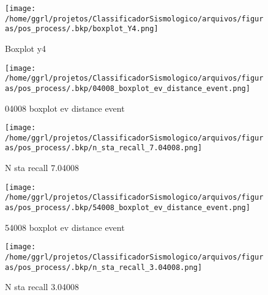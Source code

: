                     \begin{figure}[H]
                        \centering
                        \texttt{[image: /home/ggrl/projetos/ClassificadorSismologico/arquivos/figuras/pos\_process/.bkp/boxplot\_Y4.png]}
                        \caption{Boxplot y4}
                        \label{fig:boxplot_Y4}
                    \end{figure}
                

                    \begin{figure}[H]
                        \centering
                        \texttt{[image: /home/ggrl/projetos/ClassificadorSismologico/arquivos/figuras/pos\_process/.bkp/04008\_boxplot\_ev\_distance\_event.png]}
                        \caption{04008 boxplot ev distance event}
                        \label{fig:04008_boxplot_ev_distance_event}
                    \end{figure}
                

                    \begin{figure}[H]
                        \centering
                        \texttt{[image: /home/ggrl/projetos/ClassificadorSismologico/arquivos/figuras/pos\_process/.bkp/n\_sta\_recall\_7.04008.png]}
                        \caption{N sta recall 7.04008}
                        \label{fig:n_sta_recall_7.04008}
                    \end{figure}
                

                    \begin{figure}[H]
                        \centering
                        \texttt{[image: /home/ggrl/projetos/ClassificadorSismologico/arquivos/figuras/pos\_process/.bkp/54008\_boxplot\_ev\_distance\_event.png]}
                        \caption{54008 boxplot ev distance event}
                        \label{fig:54008_boxplot_ev_distance_event}
                    \end{figure}
                

                    \begin{figure}[H]
                        \centering
                        \texttt{[image: /home/ggrl/projetos/ClassificadorSismologico/arquivos/figuras/pos\_process/.bkp/n\_sta\_recall\_3.04008.png]}
                        \caption{N sta recall 3.04008}
                        \label{fig:n_sta_recall_3.04008}
                    \end{figure}
                

